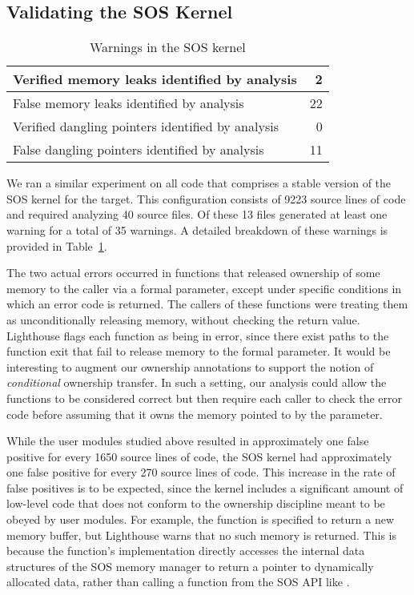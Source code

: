 \subsection{Validating the SOS Kernel}



\begin{table}[t]
\caption{Warnings in the SOS kernel}
%
\label{tab:kernel}
\centering 
\begin{tabular}{| l | r |}
    \hline 
    Verified memory leaks identified by analysis & 2 \\
    \hline
    False memory leaks identified by analysis & 22 \\
    \hline 
    Verified dangling pointers identified by analysis & 0 \\
    \hline 
    False dangling pointers identified by analysis & 11 \\
    \hline 
\end{tabular} 
%
\end{table}


We ran a similar experiment on all code that comprises a stable version of
the SOS kernel for the  target.  
%
This configuration consists of 9223 source lines of code and required
analyzing 40 source files.  
%
Of these 13 files generated at least one warning for a total of 35
warnings.  
%
A detailed breakdown of these warnings is provided in
Table~\ref{tab:kernel}.



The two actual errors occurred in functions that released ownership of
some memory to the caller via a formal parameter, except under specific
conditions in which an error code is returned.
%
The callers of these functions were treating them as unconditionally
releasing memory, without checking the return value.  
%
Lighthouse flags each function as being in error, since there exist
paths to the function exit that fail to release memory to the formal
parameter.  
%
It would be interesting to augment our ownership annotations to support
the notion of {\em conditional} ownership transfer.  
%
In such a setting, our analysis could allow the functions to be
considered correct but then require each caller to check the error code
before assuming that it owns the memory pointed to by the parameter.




While the user modules studied above resulted in approximately one false
positive for every 1650 source lines of code, the SOS kernel had
approximately one false positive for every 270 source lines of code.  
%
This increase in the rate of false positives is to be expected, since
the kernel includes a significant amount of low-level code that does not
conform to the ownership discipline meant to be obeyed by user modules.
%
For example, the function  is specified to
return a new memory buffer,  but Lighthouse warns that no such memory is
returned.  
%
This is because the function's implementation directly accesses the
internal data structures of the SOS memory manager to return a pointer
to dynamically allocated data, rather than calling a function from the
SOS API like .


